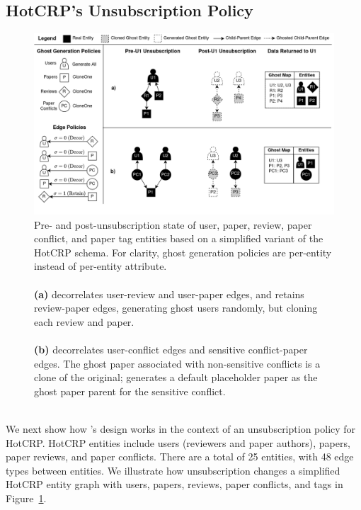 \subsection{HotCRP's Unsubscription Policy}

\begin{figure}[ht!]
    \centering
    \includegraphics[width=\textwidth]{img/decor_hotcrp}

    \caption{Pre- and post-unsubscription state of user, paper, review, paper conflict, and paper
    tag entities based on a simplified variant of the HotCRP schema. 
    For clarity, ghost generation policies are per-entity instead of per-entity
    attribute. \\ \\ 
    \textbf{(a)} \sys decorrelates user-review and user-paper edges, and retains
    review-paper edges, generating ghost users randomly, but cloning each review and paper. \\ \\
    \textbf{(b)} \sys decorrelates user-conflict edges and sensitive conflict-paper edges. The ghost
    paper associated with non-sensitive conflicts is a clone of the original; \sys generates a
    default placeholder paper as the ghost paper parent for the sensitive conflict.  \\ \\
    }
    \label{fig:hotcrp}
\end{figure}

We next show how \sys's design works in the context of an unsubscription policy for HotCRP. 
HotCRP entities include users (reviewers and paper authors), papers, paper reviews, and paper
conflicts. There are a total of 25 entities, with 48 edge types between entities.
We illustrate how unsubscription changes a simplified HotCRP entity graph with users, papers,
reviews, paper conflicts, and tags in Figure~\ref{fig:hotcrp}.

